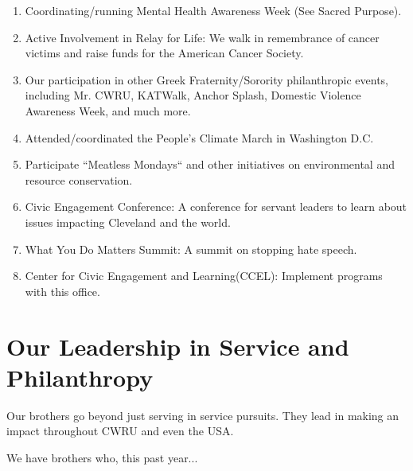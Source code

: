       \begin{enumerate}
      	\item Coordinating/running Mental Health Awareness Week (See Sacred Purpose).
      	
      	\item Active Involvement in Relay for Life: We walk in remembrance of cancer victims and raise funds for the American Cancer Society.
      	
      	\item Our participation in other Greek Fraternity/Sorority philanthropic events, including Mr. CWRU, KATWalk, Anchor Splash, Domestic Violence Awareness Week, and much more.
      	
      	\item Attended/coordinated the People's Climate March in Washington D.C.
      	
      	\item Participate ``Meatless Mondays`` and other initiatives on environmental and resource conservation.
      	
      	\item Civic Engagement Conference: A conference for servant leaders to learn about issues impacting Cleveland and the world.
      	
      	\item What You Do Matters Summit: A summit on stopping hate speech.
      	
      	\item Center for Civic Engagement and Learning(CCEL): Implement programs with this office.
      	
      \end{enumerate}
      
    \section*{Our Leadership in Service and Philanthropy}
      Our brothers go beyond just serving in service pursuits. They lead in making an impact throughout CWRU and even the USA.
      
      We have brothers who, this past year...
      
